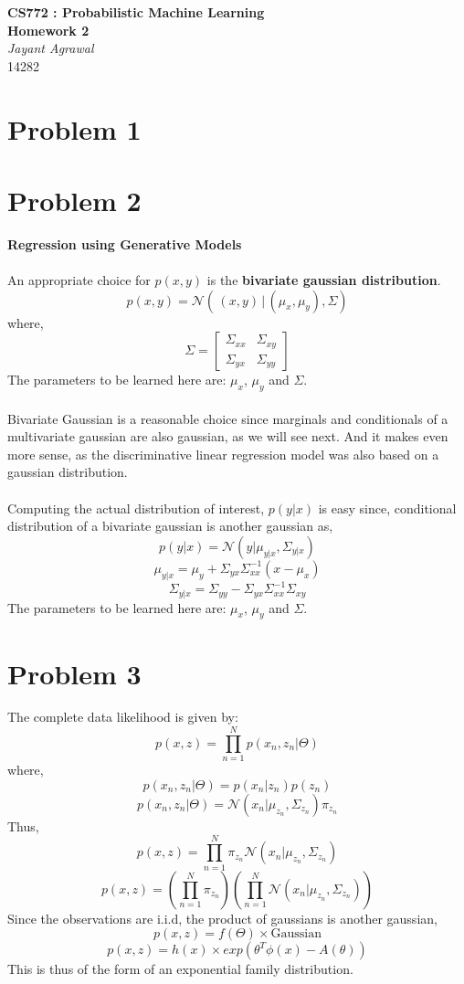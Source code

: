 \documentclass{article}
\begin{document}

\begin{center}
\textbf{\huge CS772 : Probabilistic Machine Learning} \\
\textbf{\huge Homework 2} \\
\vspace{5pt}
\textit{\Large Jayant Agrawal} \\
14282
\end{center}

\section*{Problem 1}
\section*{Problem 2}
\textbf{Regression using Generative Models} \\ \\
An appropriate choice for $p(x,y)$ is the \textbf{bivariate gaussian distribution}.
$$p(x,y) = \mathcal{N}(\hspace{2pt} (x,y)\hspace{2pt} | \hspace{2pt} (\mu_x,\mu_y), \Sigma)$$
where,
\[
\Sigma=
  \begin{bmatrix}
    \Sigma_{xx} & \Sigma_{xy}  \\
    \Sigma_{yx} & \Sigma_{yy} 
  \end{bmatrix}
\]
The parameters to be learned here are: $\mu_x$, $\mu_y$ and $\Sigma$. \\ \\
Bivariate Gaussian is a reasonable choice since marginals and conditionals of a multivariate gaussian are also gaussian, as we will see next. And it makes even more sense, as the discriminative linear regression model was also based on a gaussian distribution. \\ \\
Computing the actual distribution of interest, $p(y|x)$ is easy since, conditional distribution of a bivariate gaussian is another gaussian as,
$$p(y|x) = \mathcal{N}(y|\mu_{y|x}, \Sigma_{y|x})$$
$$\mu_{y|x} = \mu_y + \Sigma_{yx}\Sigma_{xx}^{-1}(x-\mu_x)$$
$$\Sigma_{y|x} = \Sigma_{yy} - \Sigma_{yx}\Sigma_{xx}^{-1}\Sigma_{xy}$$
The parameters to be learned here are: $\mu_x$, $\mu_y$ and $\Sigma$.

\section*{Problem 3}
The complete data likelihood is given by:
$$p(x,z) = \prod_{n=1}^Np(x_n,z_n|\Theta)$$
where,
$$p(x_n, z_n|\Theta) = p(x_n|z_n)p(z_n)$$	
$$p(x_n, z_n|\Theta) = \mathcal{N}(x_n|\mu_{z_n}, \Sigma_{z_n})\pi_{z_n}$$	
Thus, 
$$p(x,z) = \prod_{n=1}^N\pi_{z_n}\mathcal{N}(x_n|\mu_{z_n}, \Sigma_{z_n})$$
$$p(x,z) = ( \prod_{n=1}^N\pi_{z_n})(\prod_{n=1}^{N}\mathcal{N}(x_n|\mu_{z_n}, \Sigma_{z_n}))$$
Since the observations are i.i.d, the product of gaussians is another gaussian, 
$$p(x,z) = f(\Theta) \times \text{Gaussian}$$
$$p(x,z) = h(x) \times exp(\theta^T \phi(x) - A(\theta))$$
This is thus of the form of an exponential family distribution.
\end{document}
